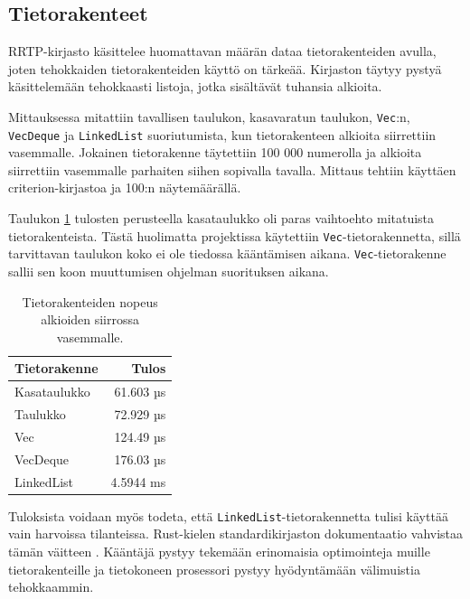 \documentclass[a4paper,12pt]{article}
\begin{document}
    \subsection{Tietorakenteet}\label{sec:structures}
    RRTP-kirjasto käsittelee huomattavan määrän dataa tietorakenteiden avulla, joten tehokkaiden tietorakenteiden käyttö on tärkeää. Kirjaston täytyy pystyä käsittelemään tehokkaasti listoja, jotka sisältävät tuhansia alkioita. \par
    Mittauksessa mitattiin tavallisen taulukon, kasavaratun taulukon,
    \lstinline{Vec}:n, \lstinline{VecDeque} ja \lstinline{LinkedList} suoriutumista, kun tietorakenteen alkioita siirrettiin vasemmalle. Jokainen tietorakenne täytettiin 100 000 numerolla ja alkioita siirrettiin vasemmalle parhaiten siihen  sopivalla tavalla.
    Mittaus tehtiin käyttäen criterion-kirjastoa ja 100:n näytemäärällä.

    Taulukon \ref{tab:collection_bench} tulosten perusteella kasataulukko oli paras vaihtoehto mitatuista tietorakenteista. Tästä huolimatta projektissa käytettiin \lstinline{Vec}-tietorakennetta, sillä tarvittavan taulukon koko ei ole tiedossa kääntämisen aikana. \lstinline{Vec}-tietorakenne sallii sen koon muuttumisen ohjelman suorituksen aikana. 

    \begin{table}[h!]
        \centering
        \begin{tabularx}{\textwidth}{|X|r|}
        \hline
            \textbf{Tietorakenne} & \textbf{Tulos}     \\ \hline
            Kasataulukko & 61.603 µs \\ \hline
            Taulukko     & 72.929 µs \\ \hline
            Vec          & 124.49 µs \\ \hline
            VecDeque     & 176.03 µs \\ \hline
            LinkedList   & 4.5944 ms \\ \hline
        \end{tabularx}
        \caption{Tietorakenteiden nopeus alkioiden siirrossa vasemmalle.}
        \label{tab:collection_bench}
    \end{table}

    Tuloksista voidaan myös todeta, että \lstinline{LinkedList}-tietorakennetta tulisi käyttää vain harvoissa tilanteissa. Rust-kielen standardikirjaston dokumentaatio vahvistaa tämän väitteen \cite[\textit{LinkedList}]{rust-std}. Kääntäjä pystyy tekemään erinomaisia optimointeja muille tietorakenteille ja tietokoneen prosessori pystyy hyödyntämään välimuistia tehokkaammin.
\end{document}
